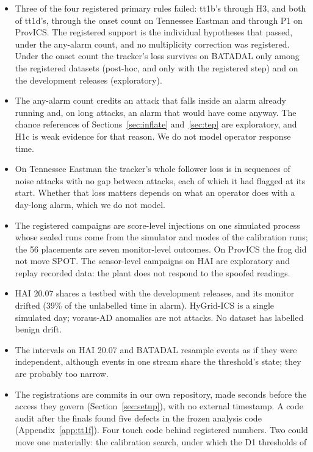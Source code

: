 \documentclass[sigconf]{acmart}
\begin{document}
\begin{itemize}
\item Three of the four registered primary rules failed: tt1b's through H3, and both of tt1d's, through
  the onset count on Tennessee Eastman and through P1 on ProvICS. The registered support is the
  individual hypotheses that passed, under the any-alarm count, and no multiplicity correction was
  registered. Under the onset count the tracker's loss survives on BATADAL only among the registered
  datasets (post-hoc, and only with the registered step) and on the development releases (exploratory).
\item The any-alarm count credits an attack that falls inside an alarm already running and, on long
  attacks, an alarm that would have come anyway. The chance references of Sections~\ref{sec:inflate}
  and~\ref{sec:tep} are exploratory, and H1c is weak evidence for that reason. We do not model operator
  response time.
\item On Tennessee Eastman the tracker's whole follower loss is in sequences of noise attacks with no gap
  between attacks, each of which it had flagged at its start. Whether that loss matters depends on
  what an operator does with a day-long alarm, which we do not model.
\item The registered campaigns are score-level injections on one simulated process whose sealed runs
  come from the simulator and modes of the calibration runs; the 56 placements are seven monitor-level
  outcomes. On ProvICS the frog did not move SPOT. The sensor-level campaigns on HAI are exploratory
  and replay recorded data: the plant does not respond to the spoofed readings.
\item HAI 20.07 shares a testbed with the development releases, and its monitor drifted (39\% of the
  unlabelled time in alarm). HyGrid-ICS is a single simulated day; voraus-AD anomalies are not attacks.
  No dataset has labelled benign drift.
\item The intervals on HAI 20.07 and BATADAL resample events as if they were independent, although
  events in one stream share the threshold's state; they are probably too narrow.
\item The registrations are commits in our own repository, made seconds before the access they govern
  (Section~\ref{sec:setup}), with no external timestamp. A code audit after the finals found five
  defects in the frozen analysis code (Appendix~\ref{app:tt1f}). Four touch code behind registered
  numbers. Two could move one materially: the calibration search, under which the D1 thresholds of

\end{itemize}
\end{document}
